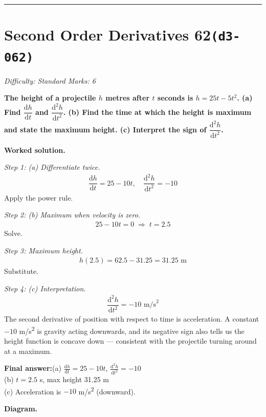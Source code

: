 \documentclass[11pt]{article}
\newcommand{\question}[1]{\par\medskip\noindent\textbf{#1}\par}
\begin{document}
\medskip\hrule

\section*{Second Order Derivatives 62\quad\small\texttt{(d3-062)}}
\textit{Difficulty: Standard \quad\textbar\quad Marks: 6}

\question{The height of a projectile \( h \) metres after \( t \) seconds is \( h = 25t - 5t^2 \). (a) Find \( \dfrac{\mathrm{d}h}{\mathrm{d}t} \) and \( \dfrac{\mathrm{d}^2h}{\mathrm{d}t^2} \). (b) Find the time at which the height is maximum and state the maximum height. (c) Interpret the sign of \( \dfrac{\mathrm{d}^2h}{\mathrm{d}t^2} \).}

\textbf{Worked solution.}

\textit{Step 1: (a) Differentiate twice.}
\[\begin{gathered}
\dfrac{\mathrm{d}h}{\mathrm{d}t} = 25 - 10t, \quad \dfrac{\mathrm{d}^2h}{\mathrm{d}t^2} = -10
\end{gathered}\]
Apply the power rule.

\textit{Step 2: (b) Maximum when velocity is zero.}
\[\begin{gathered}
25 - 10t = 0 \;\Rightarrow\; t = 2.5
\end{gathered}\]
Solve.

\textit{Step 3: Maximum height.}
\[\begin{gathered}
h(2.5) = 62.5 - 31.25 = 31.25 \text{ m}
\end{gathered}\]
Substitute.

\textit{Step 4: (c) Interpretation.}
\[\begin{gathered}
\dfrac{\mathrm{d}^2h}{\mathrm{d}t^2} = -10 \text{ m/s}^2
\end{gathered}\]
The second derivative of position with respect to time is acceleration. A constant \(-10\) m/s\textsuperscript{2} is gravity acting downwards, and its negative sign also tells us the height function is concave down --- consistent with the projectile turning around at a maximum.

\begin{answerbox}
\textbf{Final answer:}\quad (a) \(\displaystyle  \tfrac{\mathrm{d}h}{\mathrm{d}t} = 25 - 10t \), \(\displaystyle  \tfrac{\mathrm{d}^2h}{\mathrm{d}t^2} = -10 \) \\[3pt]  (b) \(\displaystyle  t = 2.5 \) s, max height 31.25 m \\[3pt]  (c) Acceleration is \(\displaystyle  -10 \) m/s\textsuperscript{2} (downward).
\end{answerbox}
\textbf{Diagram.}
\end{document}
